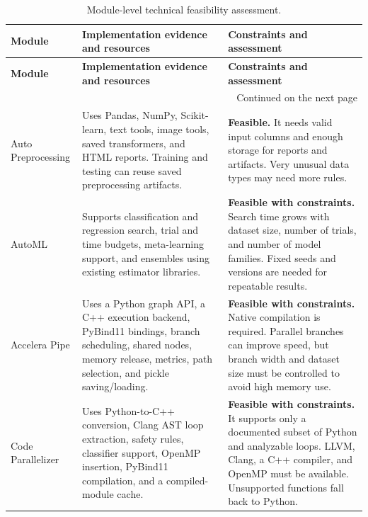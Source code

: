 \documentclass[12pt,a4paper]{report}
\newcommand{\acceleraTableStyle}{%
\small
\renewcommand{\arraystretch}{1.15}
\setlength{\tabcolsep}{4pt}%
}
\begin{document}
{\acceleraTableStyle
\begin{longtable}{p{} p{} p{}}
\caption{Module-level technical feasibility assessment.}
\label{tab:module-technical-feasibility} \\
\hline
\textbf{Module} & \textbf{Implementation evidence and resources} &
\textbf{Constraints and assessment} \\
\hline
\endfirsthead

\hline
\textbf{Module} & \textbf{Implementation evidence and resources} &
\textbf{Constraints and assessment} \\
\hline
\endhead

\hline
\multicolumn{3}{r}{\small Continued on the next page} \\
\hline
\endfoot

\hline
\endlastfoot

Auto Preprocessing & Uses Pandas, NumPy, Scikit-learn, text tools, image tools,
saved transformers, and HTML reports. Training and testing can reuse saved
preprocessing artifacts. & \textbf{Feasible.} It needs valid input columns and
enough storage for reports and artifacts. Very unusual data types may need more
rules. \\
\hline

AutoML & Supports classification and regression search, trial and time budgets,
meta-learning support, and ensembles using existing estimator libraries. &
\textbf{Feasible with constraints.} Search time grows with dataset size,
number of trials, and number of model families. Fixed seeds and versions are
needed for repeatable results. \\
\hline

Accelera Pipe & Uses a Python graph API, a C++ execution backend, PyBind11
bindings, branch scheduling, shared nodes, memory release, metrics, path
selection, and pickle saving/loading. & \textbf{Feasible with constraints.}
Native compilation is required. Parallel branches can improve speed, but branch
width and dataset size must be controlled to avoid high memory use. \\
\hline

Code Parallelizer & Uses Python-to-C++ conversion, Clang AST loop extraction,
safety rules, classifier support, OpenMP insertion, PyBind11 compilation, and a
compiled-module cache. & \textbf{Feasible with constraints.} It supports only a
documented subset of Python and analyzable loops. LLVM, Clang, a C++ compiler,
and OpenMP must be available. Unsupported functions fall back to Python. \\
\hline


\end{longtable}}
\end{document}
